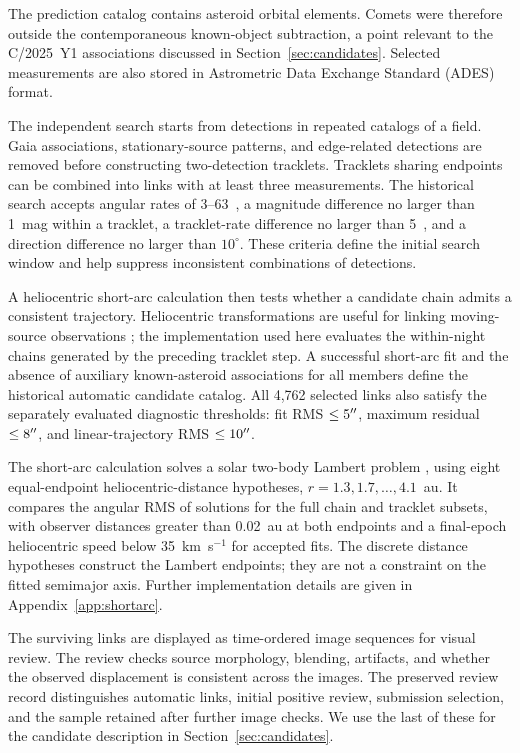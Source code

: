 The prediction catalog contains asteroid orbital elements. Comets were
therefore outside the contemporaneous known-object subtraction, a point
relevant to the C/2025~Y1 associations discussed in
Section~\ref{sec:candidates}. Selected measurements are also stored in
Astrometric Data Exchange Standard (ADES) format.

\label{sec:motion_method}

The independent search starts from detections in repeated catalogs of a
field. Gaia associations, stationary-source patterns, and edge-related
detections are removed before constructing two-detection tracklets.
Tracklets sharing endpoints can be combined into links with at least
three measurements. The historical search accepts angular rates of
$3$--$63$~\rateunit, a magnitude difference no larger than 1~mag within
a tracklet, a tracklet-rate difference no larger than
5~\rateunit, and a direction difference no larger than $10^\circ$.
These criteria define the initial search window and help suppress
inconsistent combinations of detections.

A heliocentric short-arc calculation then tests whether a candidate chain
admits a consistent trajectory. Heliocentric transformations are useful
for linking moving-source observations \citep{Holman2018}; the
implementation used here evaluates the within-night chains generated by
the preceding tracklet step. A successful short-arc fit and the absence
of auxiliary known-asteroid associations for all members define the
historical automatic candidate catalog. All 4,762 selected links also satisfy the separately evaluated
diagnostic thresholds: fit RMS $\leq5^{\prime\prime}$, maximum residual
$\leq8^{\prime\prime}$, and linear-trajectory RMS $\leq10^{\prime\prime}$.

The short-arc calculation solves a solar two-body Lambert problem
\citep{Izzo2015}, using eight equal-endpoint heliocentric-distance
hypotheses, $r=1.3,1.7,\ldots,4.1$~au. It compares the angular
RMS of solutions for the full chain and tracklet subsets, with
observer distances greater than 0.02~au at both endpoints and
a final-epoch heliocentric speed below 35~km~s$^{-1}$ for
accepted fits. The discrete distance hypotheses construct the
Lambert endpoints; they are not a constraint on the fitted
semimajor axis. Further implementation details are given in
Appendix~\ref{app:shortarc}.

The surviving links are displayed as time-ordered image sequences for
visual review. The review checks source morphology, blending, artifacts,
and whether the observed displacement is consistent across the images.
The preserved review record distinguishes automatic links, initial
positive review, submission selection, and the sample retained after
further image checks. We use the last of these for the candidate
description in Section~\ref{sec:candidates}.

